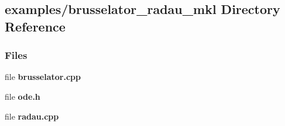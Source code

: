 \subsection{examples/brusselator\+\_\+radau\+\_\+mkl Directory Reference}
\label{dir_e5dfe7f06eb68ce44e8f7bf74da3286e}
\subsubsection*{Files}
\begin{DoxyCompactItemize}
\item 
file {\bf brusselator.\+cpp}
\item 
file {\bf ode.\+h}
\item 
file {\bf radau.\+cpp}
\end{DoxyCompactItemize}

